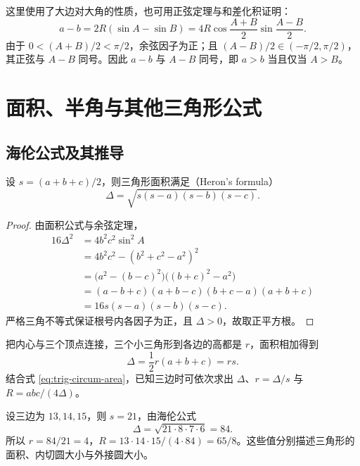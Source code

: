 \documentclass[UTF8]{ctexart}
\begin{document}
这里使用了大边对大角的性质，也可用正弦定理与和差化积证明：
\[
  a-b=2R(\sin A-\sin B)
  =4R\cos\frac{A+B}{2}\sin\frac{A-B}{2}.
\]
由于 $0<(A+B)/2<\pi/2$，余弦因子为正；且 $(A-B)/2\in(-\pi/2,\pi/2)$，其正弦与 $A-B$ 同号。因此 $a-b$ 与 $A-B$ 同号，即 $a>b$ 当且仅当 $A>B$。

\section{面积、半角与其他三角形公式}
\label{sec:trig-triangle-more}

\subsection{海伦公式及其推导}

\begin{theorem}[海伦公式]
设 $s=(a+b+c)/2$，则三角形面积满足（Heron's formula）
\begin{equation}\label{eq:trig-heron}
  \boxed{\Delta=\sqrt{s(s-a)(s-b)(s-c)}}.
\end{equation}
\end{theorem}

\begin{proof}
由面积公式与余弦定理，
\begin{align*}
  16\Delta^2
  &=4b^2c^2\sin^2 A\\
  &=4b^2c^2-(b^2+c^2-a^2)^2\\
  &=\bigl(a^2-(b-c)^2\bigr)\bigl((b+c)^2-a^2\bigr)\\
  &=(a-b+c)(a+b-c)(b+c-a)(a+b+c)\\
  &=16s(s-a)(s-b)(s-c).
\end{align*}
严格三角不等式保证根号内各因子为正，且 $\Delta>0$，故取正平方根。
\end{proof}

把内心与三个顶点连接，三个小三角形到各边的高都是 $r$，面积相加得到
\begin{equation}\label{eq:trig-inradius}
  \Delta=\frac12r(a+b+c)=rs.
\end{equation}
结合式 \eqref{eq:trig-circum-area}，已知三边时可依次求出 $\Delta$、$r=\Delta/s$ 与 $R=abc/(4\Delta)$。

\begin{example}[由三边求面积与两种半径]
设三边为 $13,14,15$，则 $s=21$，由海伦公式
\[
  \Delta=\sqrt{21\cdot8\cdot7\cdot6}=84.
\]
所以 $r=84/21=4$，$R=13\cdot14\cdot15/(4\cdot84)=65/8$。这些值分别描述三角形的面积、内切圆大小与外接圆大小。
\end{example}
\end{document}
